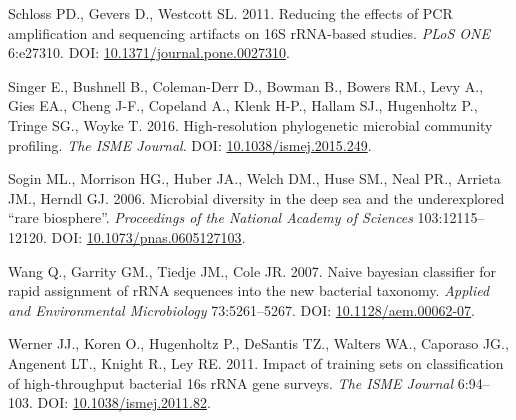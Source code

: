 \documentclass[11pt,]{article}
\begin{document}
\hypertarget{ref-Schloss2011a}{}
Schloss PD., Gevers D., Westcott SL. 2011. Reducing the effects of PCR
amplification and sequencing artifacts on 16S rRNA-based studies.
\emph{PLoS ONE} 6:e27310. DOI:
\href{https://doi.org/10.1371/journal.pone.0027310}{10.1371/journal.pone.0027310}.

\hypertarget{ref-Singer2016}{}
Singer E., Bushnell B., Coleman-Derr D., Bowman B., Bowers RM., Levy A.,
Gies EA., Cheng J-F., Copeland A., Klenk H-P., Hallam SJ., Hugenholtz
P., Tringe SG., Woyke T. 2016. High-resolution phylogenetic microbial
community profiling. \emph{The ISME Journal}. DOI:
\href{https://doi.org/10.1038/ismej.2015.249}{10.1038/ismej.2015.249}.

\hypertarget{ref-Sogin2006}{}
Sogin ML., Morrison HG., Huber JA., Welch DM., Huse SM., Neal PR.,
Arrieta JM., Herndl GJ. 2006. Microbial diversity in the deep sea and
the underexplored ``rare biosphere''. \emph{Proceedings of the National
Academy of Sciences} 103:12115--12120. DOI:
\href{https://doi.org/10.1073/pnas.0605127103}{10.1073/pnas.0605127103}.

\hypertarget{ref-Wang2007}{}
Wang Q., Garrity GM., Tiedje JM., Cole JR. 2007. Naive bayesian
classifier for rapid assignment of rRNA sequences into the new bacterial
taxonomy. \emph{Applied and Environmental Microbiology} 73:5261--5267.
DOI: \href{https://doi.org/10.1128/aem.00062-07}{10.1128/aem.00062-07}.

\hypertarget{ref-Werner2011}{}
Werner JJ., Koren O., Hugenholtz P., DeSantis TZ., Walters WA., Caporaso
JG., Angenent LT., Knight R., Ley RE. 2011. Impact of training sets on
classification of high-throughput bacterial 16s rRNA gene surveys.
\emph{The ISME Journal} 6:94--103. DOI:
\href{https://doi.org/10.1038/ismej.2011.82}{10.1038/ismej.2011.82}.
\end{document}

